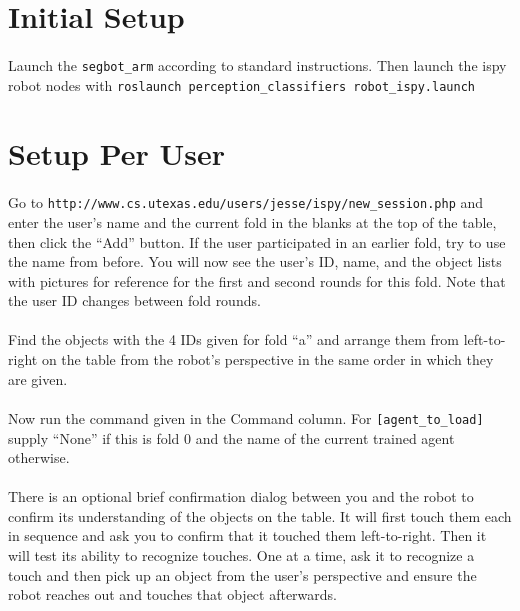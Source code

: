 \documentclass{article}
\begin{document}
\section{Initial Setup}

\paragraph{} Launch the \texttt{segbot\_arm} according to standard instructions. Then launch the ispy robot nodes with \texttt{roslaunch perception\_classifiers robot\_ispy.launch}

\section{Setup Per User}

\paragraph{} Go to \texttt{http://www.cs.utexas.edu/users/jesse/ispy/new\_session.php} and enter the user's name and the current fold in the blanks at the top of the table, then click the ``Add'' button. If the user participated in an earlier fold, try to use the name from before. You will now see the user's ID, name, and the object lists with pictures for reference for the first and second rounds for this fold. Note that the user ID changes between fold rounds.

\paragraph{} Find the objects with the 4 IDs given for fold ``a'' and arrange them from left-to-right on the table from the robot's perspective in the same order in which they are given.

\paragraph{} Now run the command given in the Command column. For \texttt{[agent\_to\_load]} supply ``None'' if this is fold 0 and the name of the current trained agent otherwise.

\paragraph{} There is an optional brief confirmation dialog between you and the robot to confirm its understanding of the objects on the table. It will first touch them each in sequence and ask you to confirm that it touched them left-to-right. Then it will test its ability to recognize touches. One at a time, ask it to recognize a touch and then pick up an object from the user's perspective and ensure the robot reaches out and touches that object afterwards.
\end{document}
